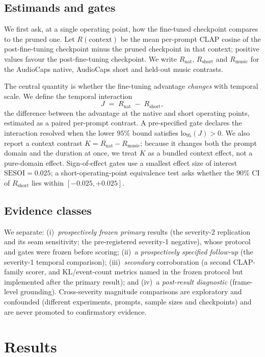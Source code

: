 \documentclass[conference]{IEEEtran}
\newcommand{\Rn}{R_{\mathrm{nat}}}
\newcommand{\Rs}{R_{\mathrm{short}}}
\newcommand{\Rm}{R_{\mathrm{music}}}
\begin{document}
\subsection{Estimands and gates}
We first ask, at a single operating point, how the fine-tuned checkpoint compares to the
pruned one. Let $R(\text{context})$ be the mean per-prompt CLAP cosine of the
post-fine-tuning checkpoint minus the pruned checkpoint in that context; positive values
favour the post-fine-tuning checkpoint. We write $\Rn$, $\Rs$ and $\Rm$ for the AudioCaps
native, AudioCaps short and held-out music contrasts.

The central quantity is whether the fine-tuning advantage \emph{changes} with temporal
scale. We define the temporal interaction
\begin{equation}
J \;=\; \Rn \;-\; \Rs ,
\end{equation}
the difference between the advantage at the native and short operating points, estimated as
a paired per-prompt contrast. A pre-specified gate declares the interaction resolved when
the lower $95\%$ bound satisfies $\mathrm{lo}_{95}(J)>0$. We also report a context contrast
$K=\Rn-\Rm$; because it changes both the prompt domain and the duration at once, we treat
$K$ as a bundled context effect, not a pure-domain effect. Sign-of-effect gates use a
smallest effect size of interest $\text{SESOI}=0.025$; a short-operating-point equivalence
test asks whether the $90\%$ CI of $\Rs$ lies within $[-0.025,+0.025]$.

\subsection{Evidence classes}
We separate: (i)~\emph{prospectively frozen primary} results (the severity-2 replication and
its seam sensitivity; the pre-registered severity-1 negative), whose protocol and gates were
frozen before scoring; (ii)~a \emph{prospectively specified follow-up} (the severity-1
temporal comparison); (iii)~\emph{secondary} corroboration (a second CLAP-family scorer, and
KL/event-count metrics named in the frozen protocol but implemented after the primary
result); and (iv)~a \emph{post-result diagnostic} (frame-level grounding). Cross-severity
magnitude comparisons are exploratory and confounded (different experiments, prompts, sample
sizes and checkpoints) and are never promoted to confirmatory evidence.

\section{Results}
\end{document}
